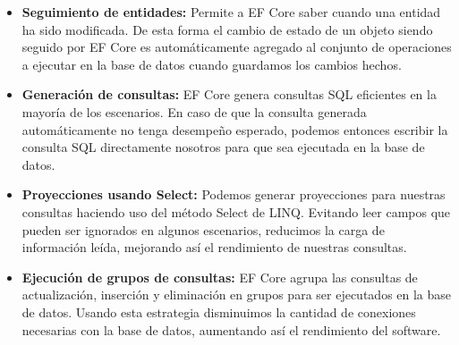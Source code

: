 \begin{itemize}
	\item \textbf{Seguimiento de entidades:} Permite a EF Core saber cuando una entidad ha sido modificada. De esta forma el cambio de estado de un objeto siendo seguido por EF Core es automáticamente agregado al conjunto de operaciones a ejecutar en la base de datos cuando guardamos los cambios hechos.
    \item \textbf{Generación de consultas:} EF Core genera consultas SQL eficientes en la mayoría de los escenarios. En caso de que la consulta generada automáticamente no tenga desempeño esperado, podemos entonces escribir la consulta SQL directamente nosotros para que sea ejecutada en la base de datos.
    \item \textbf{Proyecciones usando Select:} Podemos generar proyecciones para nuestras consultas haciendo uso del método Select de LINQ. Evitando leer campos que pueden ser ignorados en algunos escenarios, reducimos la carga de información leída, mejorando así el rendimiento de nuestras consultas.
    \item \textbf{Ejecución de grupos de consultas:} EF Core agrupa las consultas de actualización, inserción y eliminación en grupos para ser ejecutados en la base de datos. Usando esta estrategia disminuimos la cantidad de conexiones necesarias con la base de datos, aumentando así el rendimiento del software.
    
\end{itemize}